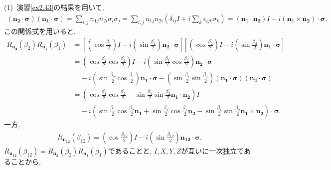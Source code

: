 \begin{ex}
    \label{ex4.15}
    (1)\
    演習\ref{ex2.43}の結果を用いて,
    \begin{align*}
        \left( \bm{n_2} \cdot \bm{\sigma }\right)\left( \bm{n_1} \cdot \bm{\sigma }\right)
        =
        \sum_{i,j} n_{1j} n_{2i} \sigma_i \sigma_j
        =
        \sum_{i,j} n_{1j} n_{2i}
        \left(
        \delta_{ij} I  + i \sum_k \epsilon_{ijk}\sigma_k
        \right)
        =
        \left( \bm{n_1} \cdot \bm{n_2}\right) I -i \left( \bm{n_1} \times \bm{n_2}\right) \cdot \bm{\sigma}.
    \end{align*}
    この関係式を用いると,
    \begin{align*}
        R_{\bm{n_2}}(\beta_2)R_{\bm{n_1}}(\beta_1)
         & =
        \left[
            \left(\cos \frac{\beta_1}{2}\right) I - i\left(\sin \frac{\beta_1}{2}\right) \bm{n_2} \cdot \bm{\sigma}
            \right]
        \left[
            \left(\cos \frac{\beta_2}{2}\right) I - i\left(\sin \frac{\beta_2}{2}\right) \bm{n_1} \cdot \bm{\sigma}
            \right]
        \\
         & =
        \left(\cos \frac{\beta_1}{2}\cos \frac{\beta_2}{2}\right) I
        - i\left(\sin \frac{\beta_1}{2}\cos \frac{\beta_2}{2}\right) \bm{n_2} \cdot \bm{\sigma}
        \\
         & \ \ \ \ \
        -i
        \left(\sin \frac{\beta_2}{2}\cos \frac{\beta_1}{2}\right) \bm{n_1} \cdot \bm{\sigma}
        -
        \left(\sin \frac{\beta_1}{2}\sin \frac{\beta_2}{2} \right)\left( \bm{n_1} \cdot \bm{\sigma }\right)\left( \bm{n_2} \cdot \bm{\sigma }\right)
        \\
         & =
        \left(
        \cos \frac{\beta_1}{2}\cos \frac{\beta_2}{2}
        -
        \sin \frac{\beta_1}{2} \sin\frac{\beta_2}{2} \bm{n_1} \cdot \bm{n_2}
        \right) I
        \\
         & \ \ \ \ \ -i
        \left(
        \sin \frac{\beta_1}{2}\cos \frac{\beta_2}{2} \bm{n_1}
        +
        \sin \frac{\beta_2}{2}\cos \frac{\beta_1}{2} \bm{n_2}
        -
        \sin \frac{\beta_1}{2} \sin\frac{\beta_2}{2} \bm{n_1} \times \bm{n_2}
        \right)
        \cdot \bm{\sigma}.
    \end{align*}
    一方,
    \begin{align*}
        R_{\bm{n_{12}}}(\beta_{12}) =
        \left(\cos \frac{\beta_{12}}{2}\right) I - i\left(\sin \frac{\beta_{12}}{2}\right) \bm{n_{12}} \cdot \bm{\sigma}.
    \end{align*}
    $R_{\bm{n_{12}}}(\beta_{12}) = R_{\bm{n_2}}(\beta_2)R_{\bm{n_1}}(\beta_1)$であることと, $I,X,Y,Z$が互いに一次独立であることから,

\end{ex}
